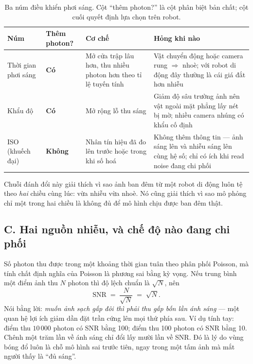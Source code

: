 \documentclass[../../../deep_learning.tex]{subfiles}
\begin{document}
\begin{table}[H]\centering\small
\caption{Ba núm điều khiển phơi sáng. Cột ``thêm photon?'' là cột phân biệt bản chất; cột cuối quyết định lựa chọn trên robot.}
\label{tab:phoi-sang}
\begin{tabularx}{\linewidth}{@{}L{2.5cm}L{1.9cm}YL{4.2cm}@{}}
\toprule
\textbf{Núm} & \textbf{Thêm photon?} & \textbf{Cơ chế} & \textbf{Hỏng khi nào}\\
\midrule
Thời gian phơi sáng & \textbf{Có} & Mở cửa trập lâu hơn, thu nhiều photon hơn theo tỉ lệ tuyến tính & Vật chuyển động hoặc camera rung \(\Rightarrow\) nhoè; với robot di động đây thường là cái giá đắt hơn nhiễu\\
Khẩu độ & \textbf{Có} & Mở rộng lỗ thu sáng & Giảm độ sâu trường ảnh nên vật ngoài mặt phẳng lấy nét bị mờ; nhiều camera nhúng có khẩu cố định\\
ISO (khuếch đại) & \textbf{Không} & Nhân tín hiệu đã đo lên trước hoặc trong khi số hoá & Không thêm thông tin --- ảnh sáng lên và nhiễu sáng lên cùng hệ số; chỉ có ích khi read noise đang chi phối\\
\bottomrule
\end{tabularx}
\end{table}


Chuỗi đánh đổi này giải thích vì sao ảnh ban đêm từ một robot di động luôn tệ theo \emph{hai} chiều cùng lúc: vừa nhiễu vừa nhoè. Nó cũng giải thích vì sao mô phỏng chỉ một trong hai chiều là không đủ để mô hình chịu được ban đêm thật.

\subsection{C. Hai nguồn nhiễu, và chế độ nào đang chi phối}
Số photon thu được trong một khoảng thời gian tuân theo phân phối Poisson, mà tính chất định nghĩa của Poisson là phương sai bằng kỳ vọng. Nếu trung bình một điểm ảnh thu \(N\) photon thì độ lệch chuẩn là \(\sqrt{N}\), nên
\[
\mathrm{SNR} \;=\; \frac{N}{\sqrt{N}} \;=\; \sqrt{N}.
\]
Nói bằng lời: \emph{muốn ảnh sạch gấp đôi thì phải thu gấp bốn lần ánh sáng} --- một quan hệ lợi ích giảm dần đặt trần cứng lên mọi thứ phía sau. Ví dụ tính tay: điểm thu \(10\,000\) photon có SNR bằng 100; điểm thu 100 photon có SNR bằng 10. Chênh một trăm lần về ánh sáng chỉ đổi lấy mười lần về SNR. Đó là lý do vùng bóng đổ luôn là chỗ mô hình sai trước tiên, ngay trong một tấm ảnh mà mắt người thấy là ``đủ sáng''.
\end{document}
